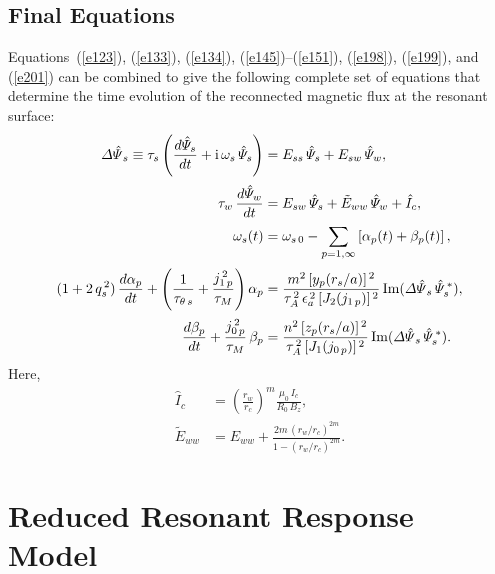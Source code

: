 \documentclass[notitlepage,12pt]{article}
\begin{document}
\subsection{Final Equations}
Equations~(\ref{e123}), (\ref{e133}), (\ref{e134}),  (\ref{e145})--(\ref{e151}), (\ref{e198}), (\ref{e199}), and (\ref{e201})
can be combined to give the following complete set of equations that determine the time evolution of the reconnected 
magnetic flux at the resonant surface:
\begin{align}\label{e202}
{\mit\Delta\hat{\Psi}}_s\equiv \tau_s\left(\frac{d\hat{\mit\Psi}_s}{dt} + {\rm i}\,\omega_s\,\hat{\mit\Psi}_s\right) &= E_{ss}\,\hat{\mit\Psi}_s + E_{sw}\,\hat{\mit\Psi}_w,\\[0.5ex]
\tau_w\,\frac{d\hat{\mit\Psi}_w}{dt} &= E_{sw}\,\hat{\mit\Psi}_s +\tilde{E}_{ww}\,\hat{\mit\Psi}_w
+\hat{I}_c,\label{e203}\\[0.5ex]
\omega_s(t)& = \omega_{s\,0} - \sum_{p=1,\infty}\left[\alpha_p(t)+\beta_p(t)\right],\label{e210a}\\[0.5ex]
(1+2\,q_s^{\,2})\,\frac{d\alpha_p}{dt} + \left(\frac{1}{\tau_{\theta\,s}}+\frac{j_{1\,p}^{\,2}}{\tau_{M}}\right)\alpha_p
&= \frac{m^{2}\,[y_p(r_s/a)]^{\,2}}{\tau_A^{\,2}\,\epsilon_a^{\,2}\,[J_2(j_{1\,p})]^{\,2}}
\,{\rm Im}({\mit\Delta\hat{\Psi}}_s\,\hat{\mit\Psi}_s^{\,\ast}),\label{e205}\\[0.5ex]
\frac{d\beta_p}{dt} + \frac{j_{0\,p}^{\,2}}{\tau_{M}}\,\beta_p
&= \frac{n^{2}\,[z_p(r_s/a)]^{\,2}}{\tau_A^{\,2}\,[J_1(j_{0\,p})]^{\,2}}\,
{\rm Im}({\mit\Delta\hat{\Psi}}_s\,\hat{\mit\Psi}_s^{\,\ast}).\label{e206}
\end{align}
Here, 
\begin{align}
\hat{I}_c &= \left(\frac{r_w}{r_c}\right)^m\frac{\mu_0\,I_c}{R_0\,B_z},\\[0.5ex]
\tilde{E}_{ww} &= E_{ww} + \frac{2m\,(r_w/r_c)^{2m}}{1-(r_w/r_c)^{2m}}.\label{e208}
\end{align}

\section{Reduced Resonant  Response Model}\label{ff}
\end{document}
